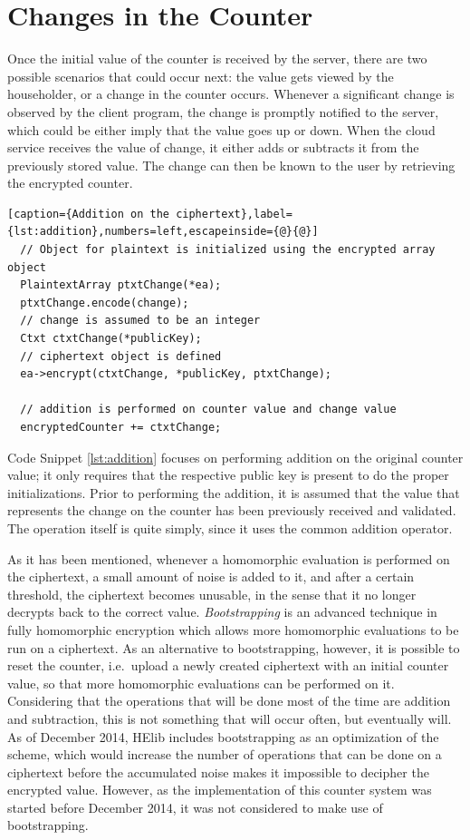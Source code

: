 \section{{Changes in the Counter}}

Once the initial value of the counter is received by the server, there are two possible scenarios that could occur next: the value gets viewed by the householder, or a change in the counter occurs. Whenever a significant change is observed by the client program, the change is promptly notified to the server, which could be either imply that the value goes up or down. When the cloud service receives the value of change, it either adds or subtracts it from the previously stored value. The change can then be known to the user by retrieving the encrypted counter.
\newline
\begin{lstlisting}[caption={Addition on the ciphertext},label={lst:addition},numbers=left,escapeinside={@}{@}]
  // Object for plaintext is initialized using the encrypted array object
  PlaintextArray ptxtChange(*ea);
  ptxtChange.encode(change); 
  // change is assumed to be an integer
  Ctxt ctxtChange(*publicKey); 
  // ciphertext object is defined 
  ea->encrypt(ctxtChange, *publicKey, ptxtChange);

  // addition is performed on counter value and change value
  encryptedCounter += ctxtChange;
\end{lstlisting}

Code Snippet \ref{lst:addition} focuses on performing addition on the original counter value; it only requires that the respective public key is present to do the proper initializations. Prior to performing the addition, it is assumed that the value that represents the change on the counter has been previously received and validated. The operation itself is quite simply, since it uses the common addition operator. 

As it has been mentioned, whenever a homomorphic evaluation is performed on the ciphertext, a small amount of noise is added to it, and after a certain threshold, the ciphertext becomes unusable, in the sense that it no longer decrypts back to the correct value. \emph{Bootstrapping} is an advanced technique in fully homomorphic encryption which allows more homomorphic evaluations to be run on a ciphertext. As an alternative to bootstrapping, however, it is possible to reset the counter, i.e.\ upload a newly created ciphertext with an initial counter value, so that more homomorphic evaluations can be performed on it.  Considering that the operations that will be done most of the time are addition and subtraction, this is not something that will occur often, but eventually will. As of December 2014, HElib includes bootstrapping as an optimization of the scheme, which would increase the number of operations that can be done on a ciphertext before the accumulated noise makes it impossible to decipher the encrypted value. However, as the implementation of this counter system was started before December 2014, it was not considered to make use of bootstrapping.

